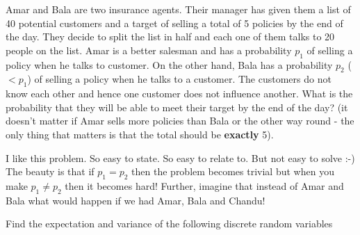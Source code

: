 \documentclass[solution,addpoints,12pt]{exam}
\begin{document}
\begin{questions}

\question[1] Amar and Bala are two insurance agents. Their manager has given them a list of 40 potential customers and a target of selling a total of 5 policies by the end of the day. They decide to split the list in half and each one of them talks to 20 people on the list. Amar is a better salesman and has a probability $p_1$ of selling a policy when he talks to customer. On the other hand, Bala has a probability $p_2$ ($< p_1$) of selling a policy when he talks to a customer. The customers do not know each other and hence one customer does not influence another. What is the probability that they will be able to meet their target by the end of the day? (it doesn't matter if Amar sells more policies than Bala or the other way round - the only thing that matters is that the total should be \textbf{exactly} 5). 
\begin{solution}
I like this problem. So easy to state. So easy to relate to. But not easy to solve :-) The beauty is that if $p_1 = p_2$ then the problem becomes trivial but when you make $p_1 \neq p_2$ then it becomes hard! Further, imagine that instead of Amar and Bala what would happen if we had Amar, Bala and Chandu!
\end{solution}

\question Find the expectation and variance of the following discrete random variables

\end{questions}
\end{document}

